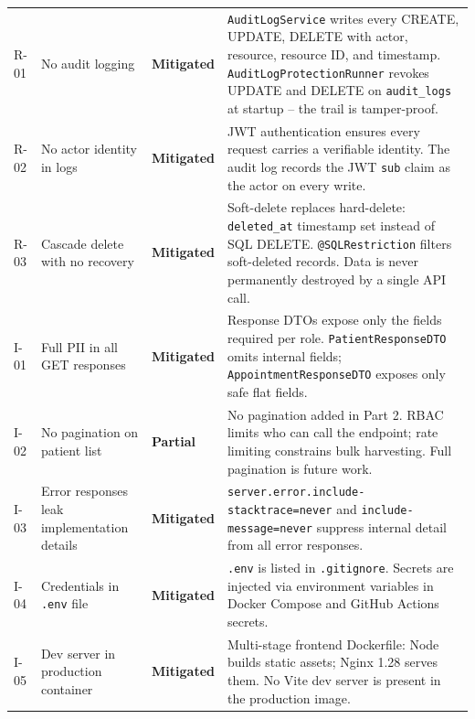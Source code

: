 \documentclass[12pt,a4paper]{report}
\begin{document}
\begin{longtable}{S{1.3cm} S{3.0cm} S{2.0cm} p{6.7cm}}
R-01 & No audit logging & \textbf{\textcolor{sevlow}{Mitigated}} &
  \texttt{AuditLogService} writes every CREATE, UPDATE, DELETE with actor, resource,
  resource ID, and timestamp. \texttt{AuditLogProtectionRunner} revokes UPDATE and
  DELETE on \texttt{audit\_logs} at startup -- the trail is tamper-proof. \\[6pt]

R-02 & No actor identity in logs & \textbf{\textcolor{sevlow}{Mitigated}} &
  JWT authentication ensures every request carries a verifiable identity. The audit log
  records the JWT \texttt{sub} claim as the actor on every write. \\[6pt]

R-03 & Cascade delete with no recovery & \textbf{\textcolor{sevlow}{Mitigated}} &
  Soft-delete replaces hard-delete: \texttt{deleted\_at} timestamp set instead of SQL
  DELETE. \texttt{@SQLRestriction} filters soft-deleted records. Data is never
  permanently destroyed by a single API call. \\[6pt]

I-01 & Full PII in all GET responses & \textbf{\textcolor{sevlow}{Mitigated}} &
  Response DTOs expose only the fields required per role. \texttt{PatientResponseDTO}
  omits internal fields; \texttt{AppointmentResponseDTO} exposes only safe flat fields. \\[6pt]

I-02 & No pagination on patient list & \textbf{\textcolor{sevmedium}{Partial}} &
  No pagination added in Part 2. RBAC limits who can call the endpoint; rate limiting
  constrains bulk harvesting. Full pagination is future work. \\[6pt]

I-03 & Error responses leak implementation details & \textbf{\textcolor{sevlow}{Mitigated}} &
  \texttt{server.error.include-stacktrace=never} and \texttt{include-message=never}
  suppress internal detail from all error responses. \\[6pt]

I-04 & Credentials in \texttt{.env} file & \textbf{\textcolor{sevlow}{Mitigated}} &
  \texttt{.env} is listed in \texttt{.gitignore}. Secrets are injected via environment
  variables in Docker Compose and GitHub Actions secrets. \\[6pt]

I-05 & Dev server in production container & \textbf{\textcolor{sevlow}{Mitigated}} &
  Multi-stage frontend Dockerfile: Node builds static assets; Nginx 1.28 serves them.
  No Vite dev server is present in the production image. \\[6pt]


\end{longtable}
\end{document}
